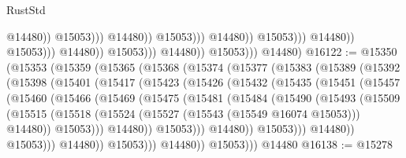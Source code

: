 \begin{lexlean}{RustStd}
\begin{coremodule}
                                                                  @14480))
                                                              @15053)))
                                                        @14480))
                                                    @15053)))
                                              @14480))
                                          @15053)))
                                    @14480))
                                @15053)))
                          @14480))
                      @15053)))
                @14480))
            @15053)))
      @14480)
@16122 := @15350
    (@15353
      (@15359
        (@15365
          (@15368
            (@15374
              (@15377
                (@15383
                  (@15389
                    (@15392
                      (@15398
                        (@15401
                          (@15417
                            (@15423
                              (@15426
                                (@15432
                                  (@15435
                                    (@15451
                                      (@15457
                                        (@15460
                                          (@15466
                                            (@15469
                                              (@15475
                                                (@15481
                                                  (@15484
                                                    (@15490
                                                      (@15493
                                                        (@15509
                                                          (@15515
                                                            (@15518
                                                              (@15524
                                                                (@15527
                                                                  (@15543 (@15549 @16074 @15053)))
                                                                @14480))
                                                            @15053)))
                                                      @14480))
                                                  @15053)))
                                            @14480))
                                        @15053)))
                                  @14480))
                              @15053)))
                        @14480))
                    @15053)))
              @14480))
          @15053)))
    @14480
@16138 := @15278

\end{coremodule}
\end{lexlean}
